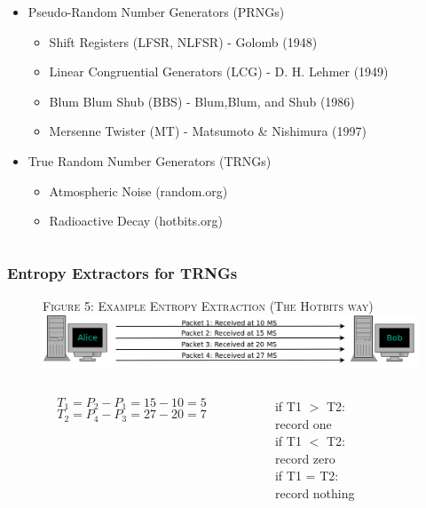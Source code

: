 \documentclass{beamer}
\begin{document}
\begin{frame}
\begin{columns}
\begin{column}{0.65\textwidth}
\begin{itemize}
	\item Pseudo-Random Number Generators (PRNGs)
	\begin{itemize}
		\item Shift Registers (LFSR, NLFSR) - Golomb (1948)
		\item Linear Congruential Generators (LCG) - D. H. Lehmer (1949)
		\item Blum Blum Shub (BBS) - Blum,Blum, and Shub (1986) 
		\item Mersenne Twister (MT) - Matsumoto \& Nishimura (1997)
	\end{itemize}	
	\item True Random Number Generators (TRNGs)
	\begin{itemize}
		\item Atmospheric Noise (random.org)
		\item Radioactive Decay (hotbits.org)
	\end{itemize}
\end{itemize}

\end{column}
\end{columns}
\end{frame}

\begin{frame}
\frametitle{Entropy Extractors for TRNGs}
\begin{figure}
{\tiny \textsc{Figure 5: Example Entropy Extraction (The Hotbits way)}}\\
\includegraphics[scale = 0.25]{images/entext.png}
\end{figure}

\begin{columns}
\begin{column}{0.5\textwidth}
$$ T_1 = P_2 - P_1 = 15 - 10 = 5 $$
$$ T_2 = P_4 - P_3 = 27 - 20 = 7 $$
\end{column}
\begin{column}{0.5\textwidth}
if T1 $>$ T2: \\
    \hspace{2 em} record one\\
if T1 $<$ T2:\\
    \hspace{2 em} record zero\\
if T1 = T2: \\
    \hspace{2 em} record nothing

\end{column}
\end{columns}
\end{frame}
\end{document}
